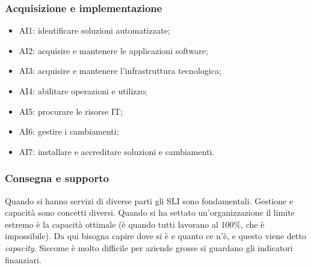 \subsubsection{Acquisizione e implementazione}

\begin{itemize}
\item AI1: identificare soluzioni automatizzate;
\item AI2: acquisire e mantenere le applicazioni software;
\item AI3: acquisire e mantenere l'infrastruttura tecnologica;
\item AI4: abilitare operazioni e utilizzo;
\item AI5: procurare le risorse IT;
\item AI6: gestire i cambiamenti;
\item AI7: installare e accreditare soluzioni e cambiamenti.
\end{itemize}

\subsubsection{Consegna e supporto}

Quando si hanno servizi di diverse parti gli SLI sono fondamentali.
Gestione e capacità sono concetti diversi. Quando si ha settato 
un'organizzazione il limite estremo è la capacità ottimale (è quando tutti 
lavorano al 100\%, che è impossibile). Da qui bisogna capire dove si è e quanto 
ce n'è, e questo viene detto \textit{capacity}. Siccome è molto difficile per 
aziende grosse si guardano gli indicatori finanziari.
